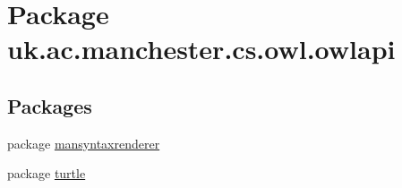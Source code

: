 \hypertarget{namespaceuk_1_1ac_1_1manchester_1_1cs_1_1owl_1_1owlapi}{\section{Package uk.\-ac.\-manchester.\-cs.\-owl.\-owlapi}
\label{namespaceuk_1_1ac_1_1manchester_1_1cs_1_1owl_1_1owlapi}
}
\subsection*{Packages}
\begin{DoxyCompactItemize}
\item 
package \hyperlink{namespaceuk_1_1ac_1_1manchester_1_1cs_1_1owl_1_1owlapi_1_1mansyntaxrenderer}{mansyntaxrenderer}
\item 
package \hyperlink{namespaceuk_1_1ac_1_1manchester_1_1cs_1_1owl_1_1owlapi_1_1turtle}{turtle}
\end{DoxyCompactItemize}
